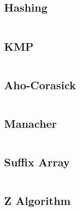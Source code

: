 \subsection{Hashing} %
\inputminted{cpp}{src/String/hash.cpp}

\subsection{KMP} %
\inputminted{cpp}{src/String/kmp.cpp}

\subsection{Aho-Corasick} %
\inputminted{cpp}{src/String/aho-corasick.cpp}

\subsection{Manacher} %
\inputminted{cpp}{src/String/manacher.cpp}

\subsection{Suffix Array} %
\inputminted{cpp}{src/String/suffix-array.cpp}

\subsection{Z Algorithm} %
\inputminted{cpp}{src/String/z.cpp}